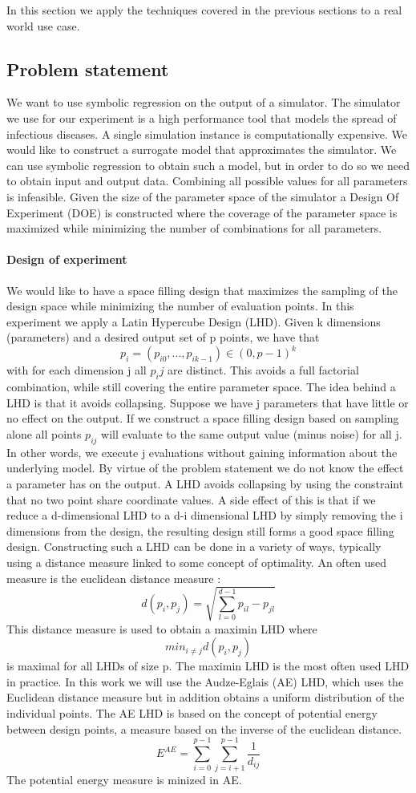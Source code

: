In this section we apply the techniques covered in the previous sections to a real world use case.
\subsection{Problem statement}
We want to use symbolic regression on the output of a simulator. The simulator we use for our experiment is a high performance tool \citep{stride} that models the spread of infectious diseases. A single simulation instance is computationally expensive. We would like to construct a surrogate model that approximates the simulator. We can use symbolic regression to obtain such a model, but in order to do so we need to obtain input and output data. Combining all possible values for all parameters is infeasible. 
Given the size of the parameter space of the simulator a Design Of Experiment (DOE) is constructed where the coverage of the parameter space is maximized while minimizing the number of combinations for all parameters. 
\paragraph{Design of experiment}
We would like to have a space filling design that maximizes the sampling of the design space while minimizing the number of evaluation points.
In this experiment we apply a Latin Hypercube Design (LHD). 
Given k dimensions (parameters) and a desired output set of p points, we have that 
\[
p_i = (p_{i0}, ..., p_{i k-1}) \in (0, p -1)^k
\]
with for each dimension j all $p_ij$ are distinct. This avoids a full factorial combination, while still covering the entire parameter space. 
The idea behind a LHD is that it avoids collapsing. Suppose we have j parameters that have little or no effect on the output. If we construct a space filling design based on sampling alone all points $p_{ij}$ will evaluate to the same output value (minus noise) for all j. In other words, we execute j evaluations without gaining information about the underlying model. By virtue of the problem statement we do not know the effect a parameter has on the output. A LHD avoids collapsing by using the constraint that no two point share coordinate values. A side effect of this is that if we reduce a d-dimensional LHD to a d-i dimensional LHD by simply removing the i dimensions from the design, the resulting design still forms a good space filling design.
Constructing such a LHD can be done in a variety of ways, typically using a distance measure linked to some concept of optimality. An often used measure is the euclidean distance measure :
\[
d(p_i, p_j) = \sqrt{\sum_{l=0}^{d-1}{p_{il}-p_{jl}}}
\]
This distance measure is used to obtain a maximin LHD where
\[
min_{i \neq j} d(p_i,p_j)
\]
is maximal for all LHDs of size p. The maximin LHD is the most often used LHD in practice. In this work we will use the Audze-Eglais \citep{AudzeEglais, AudzeEglais2, AudzeEglais3} (AE) LHD, which uses the Euclidean distance measure but in addition obtains a uniform distribution of the individual points. 
The AE LHD is based on the concept of potential energy between design points, a measure based on the inverse of the euclidean distance.
\[
E^{AE} = \sum_{i=0}^{p-1} {\sum_{j=i+1}^{p-1} {\frac{1}{d_{ij}}}}
\]
The potential energy measure is minized in AE.
